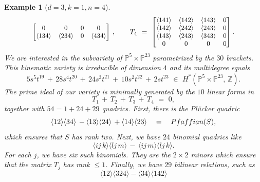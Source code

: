\documentclass[english]{ourlematema}
\numberwithin{theorem}{section}
\newtheorem{example}[theorem]{Example}
\theoremstyle{definition}
\newcommand{\PP}{\mathbb{P}}
\newcommand{\ZZ}{\mathbb{Z}}
\begin{document}
\begin{example}[$d=3,k=1,n=4$]
$$\begin{small}
\begin{bmatrix}
 0  & 0  & 0  & 0  \\
 \langle 134 \rangle & \langle 234 \rangle & 0  & \langle 434 \rangle \\
\end{bmatrix} \end{small} \, , \qquad
T_4 \,\,=\,\, 
\begin{small}
\begin{bmatrix}
 \langle 141 \rangle & \langle 142 \rangle & \langle 143 \rangle & 0  \\
 \langle 142 \rangle & \langle 242 \rangle & \langle 243 \rangle & 0  \\
 \langle 143 \rangle & \langle 243 \rangle & \langle 343 \rangle & 0  \\
 0  & 0  & 0  & 0  \\
\end{bmatrix}. \end{small}
$$
We are interested in the subvariety of $\PP^5 \times \PP^{23}$
parametrized by the $30$ brackets.
This  {\em kinematic variety} is irreducible of dimension $4$ and its {\em multidegree} equals
\begin{equation}
\label{eq:multidegree34}
5 s^5 t^{19} \,+ \, 28 s^4 t^{20} \,+\,
24 s^3 t^{21}\,+\, 10 s^2 t^{22}\,+\, 2 s t^{23}
\,\,\in\,\,
H^*(\PP^5 \times \PP^{23}, \,\ZZ).
\end{equation}
The prime ideal of our variety is minimally generated
by the $10$ linear forms in
\begin{equation}
\label{eq:relations34a}
 T_1 \,+\, T_2 \,+\, T_3 \,+\, T_4 \,\,=\,\, 0,
 \end{equation}
together with $54 = 1 + 24 + 29$ quadrics.
First, there is the Pl\"ucker quadric
\begin{equation}
\label{eq:relations34b}
\langle 12 \rangle \langle 34 \rangle \,-
\langle 13 \rangle \langle 24 \rangle \,+
\langle 14 \rangle \langle 23\rangle \quad = \quad
{\rm Pfaffian}(S), 
\end{equation}
which ensures that $S$ has rank two.
Next, we have $24$ binomial quadrics like
\begin{equation}
\label{eq:relations34c}
 \langle ij\,k \rangle \langle l j \,m \rangle \, - \,
\langle ij\,m \rangle \langle l j \,k \rangle.
\end{equation}
For each $j$, we have six such binomials. They are the $2 \times 2$ minors
 which ensure that the matrix $T_j$ has rank $\leq 1$.
Finally, we have $29$ bilinear relations, such as
\begin{equation}
\label{eq:flatrel} \langle 12 \rangle \langle 324 \rangle - \langle 34 \rangle \langle 142 \rangle

\end{equation}
\end{example}
\end{document}
